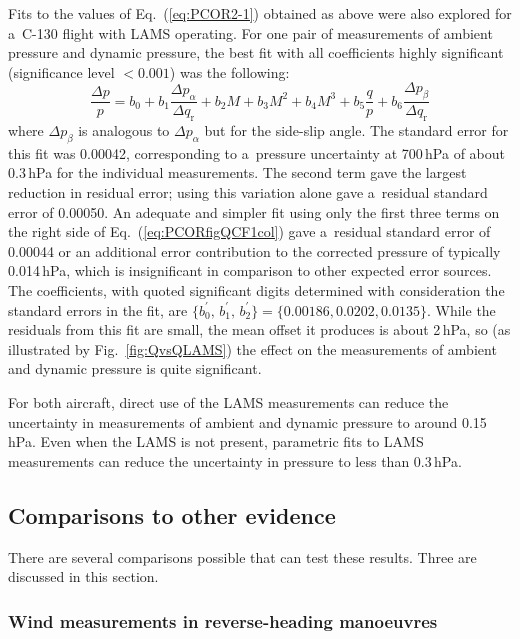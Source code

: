 \documentclass[amtd, online, hvmath]{copernicus}
\begin{document}
Fits to the values of Eq.~(\ref{eq:PCOR2-1}) obtained as above were
also explored for a~C-130 flight with LAMS operating. For one pair of
measurements of ambient pressure and dynamic pressure, the best fit
with all coefficients highly significant (significance level
$<0.001$) was the following:
\begin{equation}
\frac{\Delta p}{p}=b_0+b_1\frac{\Delta p_{\alpha}}{\Delta q_{\mathrm{r}}}+b_2M+b_3M^2+b_4M^3+b_5\frac{q}{p}+b_6\frac{\Delta p_{\beta}}{\Delta q_{\mathrm{r}}}\label{eq:PCORfigQCF1col}
\end{equation}
where $\Delta p_{\beta}$ is analogous to $\Delta p_{\alpha}$ but for
the side-slip angle. The standard error for this fit was 0.00042,
corresponding to a~pressure uncertainty at 700\,hPa of about 0.3\,hPa
for the individual measurements. The second term gave the largest
reduction in residual error; using this variation alone gave
a~residual standard error of 0.00050. An adequate and simpler fit
using only the first three terms on the right side of
Eq.~(\ref{eq:PCORfigQCF1col}) gave a~residual standard error of
0.00044 or an additional error contribution to the corrected pressure
of typically 0.014\,hPa, which is insignificant in comparison to other
expected error sources. The coefficients, with quoted significant
digits determined with consideration the standard errors in the fit,
are $\{b_0^{\prime},\,b_1^{\prime},\,b_2^{\prime}\}=\{0.00186, 0.0202,
0.0135\}$. While the residuals from this fit are small, the mean
offset it produces is about 2\,hPa, so (as illustrated by
Fig.~\ref{fig:QvsQLAMS}) the effect on the measurements of ambient and
dynamic pressure is quite significant.

For both aircraft, direct use of the LAMS measurements can reduce the
uncertainty in measurements of ambient and dynamic pressure to around
0.15\,hPa. Even when the LAMS is not present, parametric fits to LAMS
measurements can reduce the uncertainty in pressure to less than
0.3\,hPa.

\subsection{Comparisons to other evidence}

There are several comparisons possible that can test these results.
Three are discussed in this section.

\subsubsection{Wind measurements in reverse-heading manoeuvres}
\end{document}
